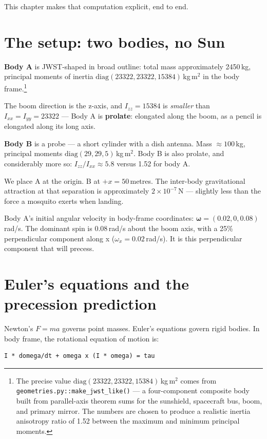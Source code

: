 \documentclass[11pt,a4paper,openany]{book}
\begin{document}
This chapter makes that computation explicit, end to end.

\section{The setup: two bodies, no Sun}

\textbf{Body A} is JWST-shaped in broad outline: total mass approximately
2450\,kg, principal moments of inertia
$\mathrm{diag}(23322, 23322, 15384)$\,kg\,m$^2$ in the body frame.\footnote{The
precise value $\mathrm{diag}(23322, 23322, 15384)$\,kg\,m$^2$ comes from
\texttt{geometries.py::make\_jwst\_like()} --- a four-component composite body
built from parallel-axis theorem sums for the sunshield, spacecraft bus, boom,
and primary mirror. The numbers are chosen to produce a realistic inertia
anisotropy ratio of 1.52 between the maximum and minimum principal moments.}

The boom direction is the z-axis, and $I_{zz} = 15384$ is \emph{smaller} than
$I_{xx} = I_{yy} = 23322$ --- Body A is \textbf{prolate}: elongated along the
boom, as a pencil is elongated along its long axis.

\textbf{Body B} is a probe --- a short cylinder with a dish antenna. Mass
$\approx 100$\,kg, principal moments $\mathrm{diag}(29, 29, 5)$\,kg\,m$^2$.
Body B is also prolate, and considerably more so: $I_{zz}/I_{xx} \approx 5.8$
versus 1.52 for body A.

We place A at the origin. B at $+x = 50$\,metres. The inter-body
gravitational attraction at that separation is approximately
$2 \times 10^{-7}$\,N --- slightly less than the force a mosquito exerts
when landing.

Body A's initial angular velocity in body-frame coordinates:
$\boldsymbol{\omega} = (0.02, 0, 0.08)$\,rad/s. The dominant spin is
0.08\,rad/s about the boom axis, with a 25\% perpendicular component along
x ($\omega_x = 0.02$\,rad/s). It is this perpendicular component that will
precess.

\section{Euler's equations and the precession prediction}

Newton's $F = ma$ governs point masses. Euler's equations govern rigid bodies.
In body frame, the rotational equation of motion is:
\begin{lstlisting}[style=shaddata]
I * domega/dt + omega x (I * omega) = tau
\end{lstlisting}
\end{document}
